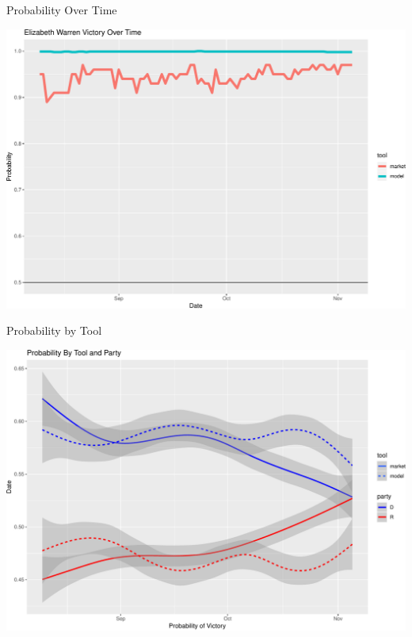 \documentclass[ignorenonframetext,]{beamer}
\begin{document}
\begin{frame}{Probability Over Time}

\includegraphics{markets_models_files/figure-beamer/unnamed-chunk-2-1.pdf}

\end{frame}

\begin{frame}{Probability by Tool}

\includegraphics{markets_models_files/figure-beamer/prob tool-1.pdf}

\end{frame}
\end{document}
